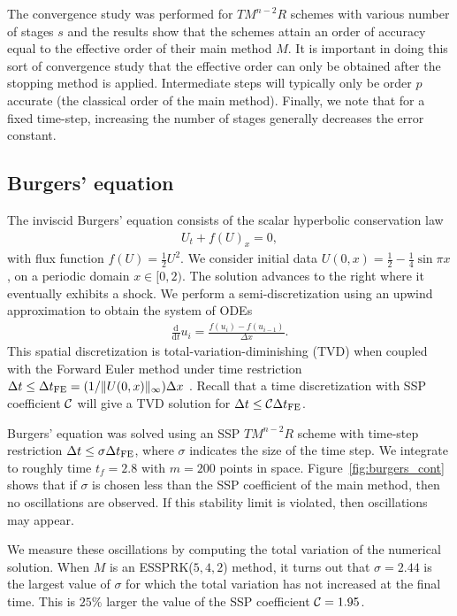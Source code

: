 The convergence study was performed for $TM^{n-2}R$ schemes with
various number of stages $s$ and the results show that the schemes
attain an order of accuracy equal to the effective order of their main
method $M$.
It is important in doing this sort of convergence study that the
effective order can only be obtained after the stopping method is
applied.
Intermediate steps will typically only be order $p$ accurate (the classical
order of the main method).
Finally, we note that for a fixed time-step, increasing the number of stages
generally decreases the error constant.

\subsection{Burgers' equation}\label{subsubsec:burgers}
The inviscid Burgers' equation consists of the scalar hyperbolic conservation law
\begin{align}\label{eq:HCL}
    U_{t} + f(U)_{x} = 0,
\end{align}
with flux function $f(U) = \frac{1}{2}U^{2}$. 
We consider initial data
$U(0,x)  = \frac{1}{2} - \frac{1}{4}\sin{\pi x}$,
on a periodic domain $x \in [0,2)$.
The solution advances to the right where it eventually exhibits a shock. 
We perform a semi-discretization
using an upwind approximation to obtain the system of ODEs
\begin{align*}\label{eq:burgers_flux}
	\frac{\textrm{d}}{\textrm{d} t} u_i = \frac{f(u_{i}) - f(u_{i-1})}{\Delta x}.
\end{align*}
This spatial discretization is total-variation-diminishing (TVD) when
coupled with the Forward Euler method under time restriction
$\Delta t \leq {\Delta t}_{\text{FE}} = (1 / \|U(0,x)\|_{\infty}) \Delta x$
\cite{Laney:1998}.  %
Recall that a time discretization with SSP
coefficient $\mathcal{C}$ will give a TVD solution for $\Delta t \leq
\mathcal{C} {\Delta t}_{\text{FE}}$.

Burgers' equation was solved using an SSP $TM^{n-2}R$ scheme with time-step
restriction $\Delta t \leq \sigma{\Delta t}_{\text{FE}}$, where $\sigma$ indicates the size 
of the time step. 
We integrate to roughly time $t_{f} = 2.8$ with $m = 200$ points in space.
Figure~\ref{fig:burgers_cont} shows that if $\sigma$ is chosen less than the SSP
coefficient of the main method, then no oscillations are observed. 
If this stability limit is violated, then oscillations may appear.

We measure these oscillations by computing the total variation of the 
numerical solution.
When $M$ is an ESSPRK($5,4,2$) method,
it turns out that $\sigma = 2.44$ is the largest value of $\sigma$
for which the total variation has not increased at the final time.
This is $25\%$ larger the value of the SSP coefficient $\mathcal{C} = 1.95$.

